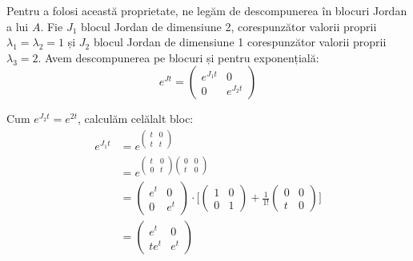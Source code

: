 \documentclass[11pt,a4paper]{article}
\theoremstyle{dotless}
\theoremstyle{dotlessdr}
\begin{document}
Pentru a folosi această proprietate, ne legăm de descompunerea în blocuri
Jordan a lui $A$. Fie $J_1$ blocul Jordan de dimensiune 2, corespunzător
valorii proprii $\lambda_1 = \lambda_2 = 1$ și $J_2$ blocul Jordan de dimensiune 1
corespunzător valorii proprii $\lambda_3 = 2$. Avem descompunerea pe blocuri și
pentru exponențială:
\[
  e^{Jt} = \begin{pmatrix}
    e^{J_1 t} & 0 \\
    0 & e^{J_2 t}
  \end{pmatrix}
\]

Cum $e^{J_2 t} = e^{2t}$, calculăm celălalt bloc:
\begin{align*}
  e^{J_1 t} &= e^{\begin{pmatrix} t & 0 \\ t & t \end{pmatrix}} \\
            &= e^{\begin{pmatrix} t & 0 \\ 0 & t \end{pmatrix}
                                               \begin{pmatrix} 0 & 0 \\ t & 0 \end{pmatrix}} \\
            &= \begin{pmatrix} e^t & 0 \\ 0 & e^t \end{pmatrix} \cdot
                                              \Bigg[ \begin{pmatrix} 1 & 0 \\ 0 & 1 \end{pmatrix} +
                                                                                  \frac{1}{1!} \begin{pmatrix} 0 & 0 \\ t & 0 \end{pmatrix} \Bigg] \\
            &= \begin{pmatrix}
              e^t & 0 \\
              te^t & e^t 
            \end{pmatrix}
\end{align*}
\end{document}
